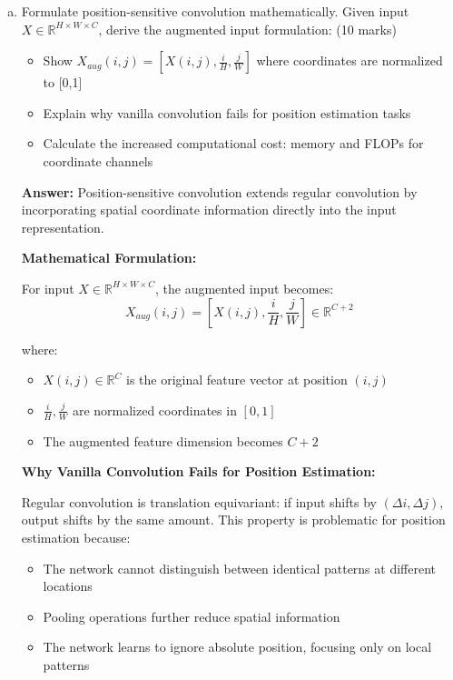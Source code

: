 \documentclass[12pt]{article}
\newcommand{\answer}[1]{{\color{answercolor}\textbf{Answer:} #1}}
\newcommand{\explanation}[1]{{\color{explanationcolor}#1}}
\begin{document}
\begin{enumerate}[(a)]
    \item Formulate position-sensitive convolution mathematically. Given input $X \in \mathbb{R}^{H \times W \times C}$, derive the augmented input formulation: \hfill (10 marks)
    \begin{itemize}
        \item Show $X_{aug}(i,j) = [X(i,j), \frac{i}{H}, \frac{j}{W}]$ where coordinates are normalized to [0,1]
        \item Explain why vanilla convolution fails for position estimation tasks
        \item Calculate the increased computational cost: memory and FLOPs for coordinate channels
    \end{itemize}

    \answer{Position-sensitive convolution extends regular convolution by incorporating spatial coordinate information directly into the input representation.}
    
    \explanation{
    \textbf{Mathematical Formulation:}
    
    For input $X \in \mathbb{R}^{H \times W \times C}$, the augmented input becomes:
    $$X_{aug}(i,j) = [X(i,j), \frac{i}{H}, \frac{j}{W}] \in \mathbb{R}^{C+2}$$
    
    where:
    \begin{itemize}
        \item $X(i,j) \in \mathbb{R}^C$ is the original feature vector at position $(i,j)$
        \item $\frac{i}{H}, \frac{j}{W}$ are normalized coordinates in $[0,1]$
        \item The augmented feature dimension becomes $C+2$
    \end{itemize}
    
    \textbf{Why Vanilla Convolution Fails for Position Estimation:}
    
    Regular convolution is translation equivariant: if input shifts by $(\Delta i, \Delta j)$, output shifts by the same amount. This property is problematic for position estimation because:
    \begin{itemize}
        \item The network cannot distinguish between identical patterns at different locations
        \item Pooling operations further reduce spatial information
        \item The network learns to ignore absolute position, focusing only on local patterns
    \end{itemize}
    
}
\end{enumerate}
\end{document}
